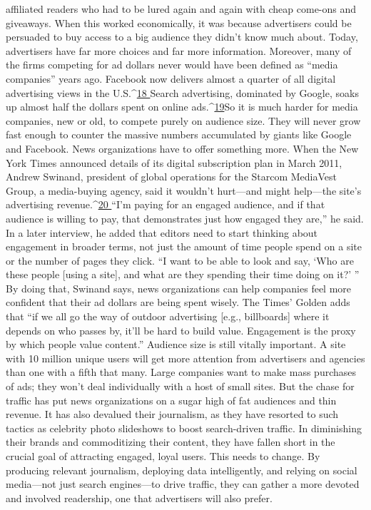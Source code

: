 affiliated readers who had to be lured again and again with cheap come-ons and
giveaways. When this worked economically, it was because advertisers could be
persuaded to buy access to a big audience they didn’t know much about. Today,
advertisers have far more choices and far more information. Moreover, many of
the firms competing for ad dollars never would have been defined as ``media
companies'' years ago. Facebook now delivers almost a quarter of all digital advertising
views in the U.S.^{\href{#endnotes-ch2}{18 }}Search advertising, dominated by Google, soaks up
almost half the dollars spent on online ads.^{\href{#endnotes-ch2}{19}}So it is much harder for media companies, new or old, to compete purely on
audience size. They will never grow fast enough to counter the massive numbers
accumulated by giants like Google and Facebook. News organizations have to
offer something more.
When the New York Times announced details of its digital subscription plan
in March 2011, Andrew Swinand, president of global operations for the Starcom
MediaVest Group, a media-buying agency, said it wouldn’t hurt—and might
help—the site’s advertising revenue.^{\href{#endnotes-ch2}{20 }}``I’m paying for an engaged audience, and
if that audience is willing to pay, that demonstrates just how engaged they are,''
he said. In a later interview, he added that editors need to start thinking about
engagement in broader terms, not just the amount of time people spend on a
site or the number of pages they click. ``I want to be able to look and say, ‘Who
are these people [using a site], and what are they spending their time doing on
it?’ '' By doing that, Swinand says, news organizations can help companies feel
more confident that their ad dollars are being spent wisely. The Times’ Golden
adds that ``if we all go the way of outdoor advertising [e.g., billboards] where it
depends on who passes by, it’ll be hard to build value. Engagement is the proxy
by which people value content.''
Audience size is still vitally important. A site with 10 million unique users will
get more attention from advertisers and agencies than one with a fifth that many.
Large companies want to make mass purchases of ads; they won’t deal individually
with a host of small sites. But the chase for traffic has put news organizations
on a sugar high of fat audiences and thin revenue. It has also devalued their
journalism, as they have resorted to such tactics as celebrity photo slideshows to
boost search-driven traffic. In diminishing their brands and commoditizing their
content, they have fallen short in the crucial goal of attracting engaged, loyal
users. This needs to change. By producing relevant journalism, deploying data
intelligently, and relying on social media—not just search engines—to drive traffic,
they can gather a more devoted and involved readership, one that advertisers
will also prefer.

